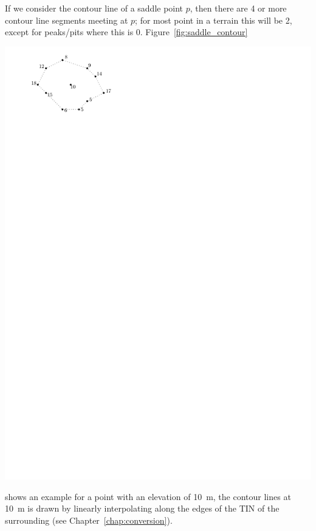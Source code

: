If we consider the contour line of a saddle point $p$, then there are 4 or more contour line segments meeting at $p$; for most point in a terrain this will be 2, except for peaks/pits where this is 0.
Figure~\ref{fig:saddle_contour}
\begin{marginfigure}
  \centering
  \includegraphics[page=2,width=\textwidth]{figs/saddle_contour}
  \caption{A saddle point at elevation \qty{10}{\m}, and its surrounding points. The triangulation of the area is created and used to extract the contour line segments at \qty{10}{\m} (red lines).}%
\label{fig:saddle_contour}
\end{marginfigure}
shows an example for a point with an elevation of \qty{10}{\m}, the contour lines at \qty{10}{\m} is drawn by linearly interpolating along the edges of the TIN of the surrounding (see Chapter~\ref{chap:conversion}).


